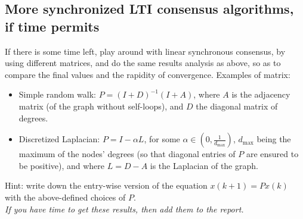 \documentclass{article}
\begin{document}
\subsection{More synchronized LTI consensus algorithms, if time permits}
If there is some time left, play around with linear synchronous consensus, by using different matrices, and do the same results analysis as above, so as to compare the final values and the rapidity of convergence. Examples of matrix:
\begin{itemize}
\item Simple random walk: $P = (I+D)^{-1} (I+A)$, where $A$ is the adjacency matrix (of the graph without self-loops), and $D$ the diagonal matrix of degrees.
\item Discretized Laplacian:  $P = I - \alpha L$, for some $\alpha \in (0,\frac{1}{d_{\max}})$, $d_{\max}$ being the maximum of the nodes' degrees (so that diagonal entries of $P$ are ensured to be positive), and where $L=D-A$ is the Laplacian of the graph.
\end{itemize}
Hint: write down the entry-wise version of the equation $x(k+1) = P x(k)$ with the above-defined choices of $P$.\\

\textit{\color{blue} If you have time to get these results, then add them to the report.}


%
\end{document}
